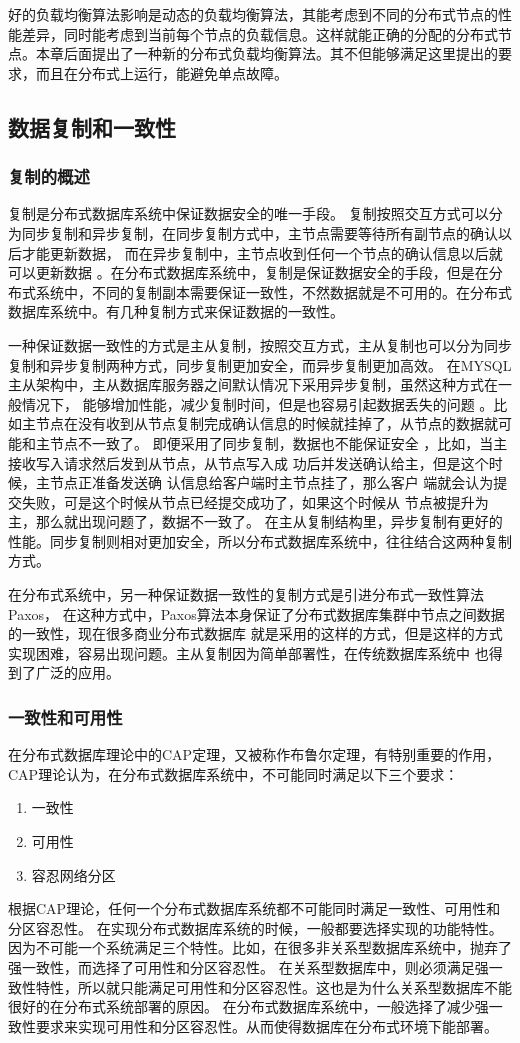 	好的负载均衡算法影响是动态的负载均衡算法，其能考虑到不同的分布式节点的性能差异，同时能考虑到当前每个节点的负载信息。这样就能正确的分配的分布式节点。本章后面提出了一种新的分布式负载均衡算法。其不但能够满足这里提出的要求，而且在分布式上运行，能避免单点故障。
\subsection{数据复制和一致性}
\subsubsection{复制的概述}
复制是分布式数据库系统中保证数据安全的唯一手段。
复制按照交互方式可以分为同步复制和异步复制，在同步复制方式中，主节点需要等待所有副节点的确认以后才能更新数据，
而在异步复制中，主节点收到任何一个节点的确认信息以后就可以更新数据
。在分布式数据库系统中，复制是保证数据安全的手段，但是在分布式系统中，不同的复制副本需要保证一致性，不然数据就是不可用的。在分布式数据库系统中。有几种复制方式来保证数据的一致性。



一种保证数据一致性的方式是主从复制，按照交互方式，主从复制也可以分为同步复制和异步复制两种方式，同步复制更加安全，而异步复制更加高效。
在MYSQL主从架构中，主从数据库服务器之间默认情况下采用异步复制，虽然这种方式在一般情况下，
能够增加性能，减少复制时间，但是也容易引起数据丢失的问题
。比如主节点在没有收到从节点复制完成确认信息的时候就挂掉了，从节点的数据就可能和主节点不一致了。
即便采用了同步复制，数据也不能保证安全
，比如，当主接收写入请求然后发到从节点，从节点写入成
功后并发送确认给主，但是这个时候，主节点正准备发送确
认信息给客户端时主节点挂了，那么客户
端就会认为提交失败，可是这个时候从节点已经提交成功了，如果这个时候从
节点被提升为主，那么就出现问题了，数据不一致了。
在主从复制结构里，异步复制有更好的性能。同步复制则相对更加安全，所以分布式数据库系统中，往往结合这两种复制方式。

在分布式系统中，另一种保证数据一致性的复制方式是引进分布式一致性算法Paxos，
在这种方式中，Paxos算法本身保证了分布式数据库集群中节点之间数据的一致性，现在很多商业分布式数据库
就是采用的这样的方式，但是这样的方式实现困难，容易出现问题。主从复制因为简单部署性，在传统数据库系统中
也得到了广泛的应用。
\subsubsection{一致性和可用性}
在分布式数据库理论中的CAP定理，又被称作布鲁尔定理，有特别重要的作用，
CAP理论认为，在分布式数据库系统中，不可能同时满足以下三个要求：
\begin{enumerate}
	\item 一致性
	\item 可用性
	\item 容忍网络分区
\end{enumerate}
根据CAP理论，任何一个分布式数据库系统都不可能同时满足一致性、可用性和分区容忍性。
在实现分布式数据库系统的时候，一般都要选择实现的功能特性。
因为不可能一个系统满足三个特性。比如，在很多非关系型数据库系统中，抛弃了强一致性，而选择了可用性和分区容忍性。
在关系型数据库中，则必须满足强一致性特性，所以就只能满足可用性和分区容忍性。这也是为什么关系型数据库不能很好的在分布式系统部署的原因。
在分布式数据库系统中，一般选择了减少强一致性要求来实现可用性和分区容忍性。从而使得数据库在分布式环境下能部署。
